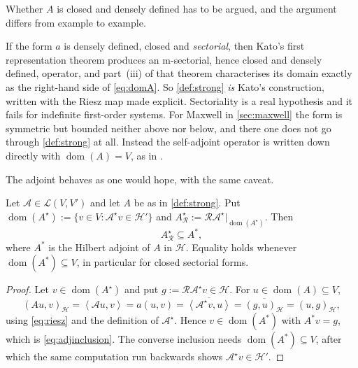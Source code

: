 \documentclass[11pt,a4paper]{article}
\theoremstyle{plain}
\newcommand{\dual}[2]{\left\langle #1, #2 \right\rangle}
\newcommand{\Hb}{\mathcal{H}}
\newcommand{\Vb}{V}
\newcommand{\Aop}{\mathcal{A}}
\DeclareMathOperator{\dom}{dom}
\newcommand{\adj}{\star}                 %
\newcommand{\Riesz}{\mathcal{R}}         %
\begin{document}
Whether $A$ is closed and densely defined has to be argued, and the argument
differs from example to example.

\begin{remark}
  \label{rem:provenance}
  If the form $a$ is densely defined, closed and \emph{sectorial}, then Kato's
  first representation theorem \cite[Theorem~VI.2.1, p.~322]{Kato1995} produces
  an m-sectorial, hence closed and densely defined, operator, and part~(iii) of
  that theorem characterises its domain exactly as the right-hand side of
  \cref{eq:domA}.  So \cref{def:strong} \emph{is} Kato's construction, written
  with the Riesz map made explicit.  Sectoriality is a real hypothesis and it
  fails for indefinite first-order systems.  For Maxwell in \cref{sec:maxwell}
  the form is symmetric but bounded neither above nor below, and there one does
  not go through \cref{def:strong} at all.  Instead the self-adjoint operator is
  written down directly with $\dom(A) = \Vb$, as in
  \cite[p.~130]{Colbrook2026}.
\end{remark}

The adjoint behaves as one would hope, with the same caveat.

\begin{lemma}
  \label{lem:adjoint}
  Let $\Aop \in \mathcal{L}(\Vb,\Vb')$ and let $A$ be as in
  \cref{def:strong}.  Put $\dom(A^{\adj}) := \{v \in \Vb : \Aop^{\adj} v \in
  \Hb'\}$ and $A^{\adj}_{\Riesz} := \Riesz\Aop^{\adj}|_{\dom(A^{\adj})}$.  Then
  \begin{equation}
    \label{eq:adjinclusion}
    A^{\adj}_{\Riesz} \subseteq A^*,
  \end{equation}
  where $A^*$ is the Hilbert adjoint of $A$ in $\Hb$.  Equality holds whenever
  $\dom(A^*) \subseteq \Vb$, in particular for closed sectorial forms.
\end{lemma}

\begin{proof}
  Let $v \in \dom(A^{\adj})$ and put $g := \Riesz\Aop^{\adj}v \in \Hb$.  For
  $u \in \dom(A) \subseteq \Vb$,
  \[
    (Au,v)_{\Hb} = \dual{\Aop u}{v} = a(u,v)
      = \overline{\dual{\Aop^{\adj}v}{u}}
      = \overline{(g,u)_{\Hb}} = (u,g)_{\Hb},
  \]
  using \cref{eq:riesz} and the definition of $\Aop^{\adj}$.  Hence $v \in
  \dom(A^*)$ with $A^*v = g$, which is \cref{eq:adjinclusion}.  The converse
  inclusion needs $\dom(A^*) \subseteq \Vb$, after which the same computation
  run backwards shows $\Aop^{\adj}v \in \Hb'$.
\end{proof}
\end{document}
